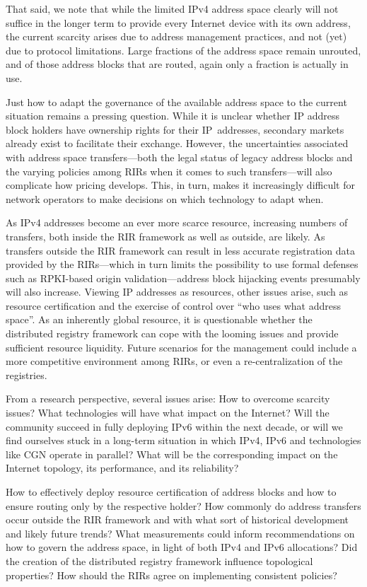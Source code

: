 \documentclass[letter]{sigcomm-alternate}
\begin{document}
That said, we note that while the limited IPv4 address space clearly will not
suffice in the longer term to provide every Internet device with its own
address, the current scarcity arises due to address management practices, and
not (yet) due to protocol limitations. Large fractions of the address space
remain unrouted, and of those address blocks that are routed, again only a
fraction is actually in use.

Just how to adapt the governance of the available address space to the current
situation remains a pressing question. While it is unclear whether IP address
block holders have ownership rights for their IP~addresses, secondary markets
already exist to facilitate their exchange.  However, the uncertainties
associated with address space transfers---both the legal status of legacy
address blocks and the varying policies among RIRs when it comes to such
transfers---will also complicate how pricing develops.  This, in turn, makes it
increasingly difficult for network operators to make decisions on 
which technology to adapt when.

As IPv4 addresses become an ever more scarce resource, increasing numbers of transfers, 
both inside the RIR framework as well as outside, are likely. 
As transfers outside the RIR framework can result in less accurate 
registration data provided by the RIRs---which in turn limits the possibility 
to use formal defenses such as RPKI-based origin validation---address block
hijacking events presumably will also increase. Viewing IP addresses as 
resources, other issues arise, such as resource certification and the exercise 
of control over ``who uses what address space''. As an inherently global 
resource, it is questionable whether the distributed registry framework can 
cope with the looming issues and provide sufficient resource liquidity.  Future 
scenarios for the management could include a more competitive environment among 
RIRs, or even a re-centralization of the registries.

From a research perspective, several issues arise: How to overcome scarcity
issues? What technologies will have what impact on the Internet? Will the 
community succeed in fully deploying IPv6 within the next decade,
or will we find ourselves 
stuck in a long-term situation in which IPv4, IPv6 and technologies like CGN 
operate in parallel?  What will be the corresponding impact on the Internet 
topology, its performance, and its reliability?

How to effectively deploy resource certification of address blocks and how to 
ensure routing only by the respective holder? How commonly do address transfers 
occur outside the RIR framework and with what sort of historical development 
and likely future trends?  What measurements could inform recommendations on 
how to govern the address space, in light of both IPv4 and IPv6 allocations? 
Did the creation of the distributed registry framework influence topological 
properties?  How should the RIRs agree on implementing consistent policies? 
\end{document}
